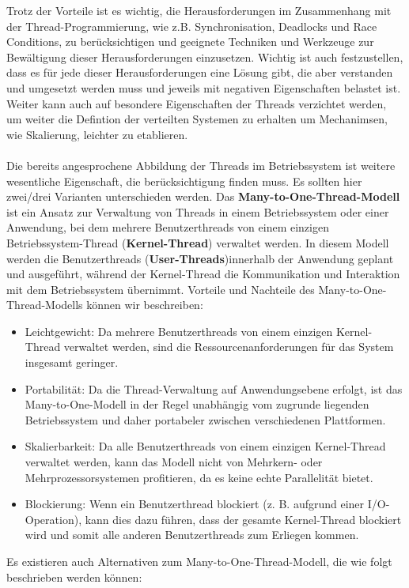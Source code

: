Trotz der Vorteile ist es wichtig, die Herausforderungen im Zusammenhang mit der Thread-Programmierung, wie z.B. Synchronisation, Deadlocks und Race Conditions, zu berücksichtigen und geeignete Techniken und Werkzeuge zur Bewältigung dieser Herausforderungen einzusetzen. Wichtig ist auch festzustellen, dass es für jede dieser Herausforderungen eine Lösung gibt, die aber verstanden und umgesetzt werden muss und jeweils mit negativen Eigenschaften belastet ist. Weiter kann auch auf besondere Eigenschaften der Threads verzichtet werden, um weiter die Defintion der verteilten Systemen zu erhalten um Mechanimsen, wie Skalierung, leichter zu etablieren.
\\\\
Die bereits angesprochene Abbildung der Threads im Betriebssystem ist weitere wesentliche Eigenschaft, die berücksichtigung finden muss. Es sollten hier zwei/drei Varianten unterschieden werden. Das \textbf{Many-to-One-Thread-Modell} ist ein Ansatz zur Verwaltung von Threads in einem Betriebssystem oder einer Anwendung, bei dem mehrere Benutzerthreads von einem einzigen Betriebssystem-Thread (\textbf{Kernel-Thread}) verwaltet werden. In diesem Modell werden die Benutzerthreads (\textbf{User-Threads})innerhalb der Anwendung geplant und ausgeführt, während der Kernel-Thread die Kommunikation und Interaktion mit dem Betriebssystem übernimmt. Vorteile und Nachteile des Many-to-One-Thread-Modells können wir beschreiben:
\begin{itemize}
\item Leichtgewicht: Da mehrere Benutzerthreads von einem einzigen Kernel-Thread verwaltet werden, sind die Ressourcenanforderungen für das System insgesamt geringer.
\item Portabilität: Da die Thread-Verwaltung auf Anwendungsebene erfolgt, ist das Many-to-One-Modell in der Regel unabhängig vom zugrunde liegenden Betriebssystem und daher portabeler zwischen verschiedenen Plattformen.
\item Skalierbarkeit: Da alle Benutzerthreads von einem einzigen Kernel-Thread verwaltet werden, kann das Modell nicht von Mehrkern- oder Mehrprozessorsystemen profitieren, da es keine echte Parallelität bietet.
\item Blockierung: Wenn ein Benutzerthread blockiert (z. B. aufgrund einer I/O-Operation), kann dies dazu führen, dass der gesamte Kernel-Thread blockiert wird und somit alle anderen Benutzerthreads zum Erliegen kommen.
\end{itemize}
Es existieren auch Alternativen zum Many-to-One-Thread-Modell, die wie folgt beschrieben werden können:
